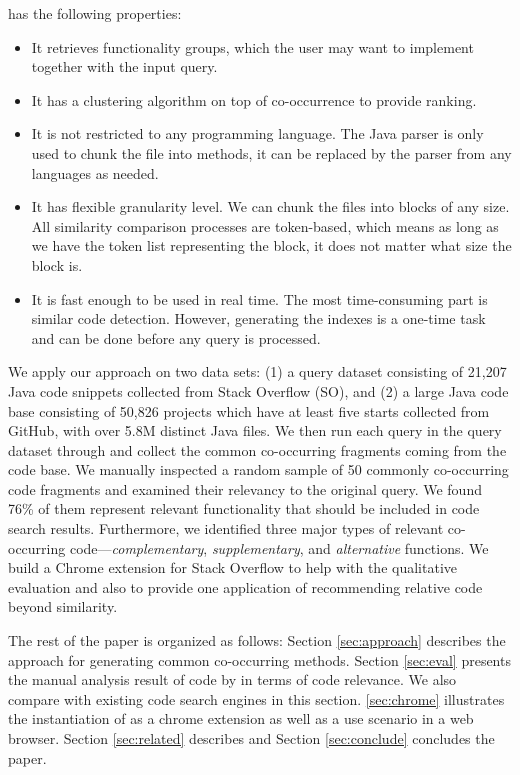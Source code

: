 {\tool} has the following properties:
\begin{itemize}
	\item It retrieves functionality groups, which the user may want to implement together with the input query.
	\item It has a clustering algorithm on top of co-occurrence to provide ranking.
	\item It is not restricted to any programming language. The Java parser is only used to chunk the file into methods, it can be replaced by the parser from any languages as needed.
	\item It has flexible granularity level. We can chunk the files into blocks of any size. All similarity comparison processes are token-based, which means as long as we have the token list representing the block, it does not matter what size the block is.
	\item It is fast enough to be used in real time. The most
          time-consuming part is similar code detection. However,
          generating the indexes is a one-time task and can be done
          before any query is processed.	
\end{itemize}

We apply our approach on two data sets: (1) a query dataset
consisting of 21,207 Java code snippets collected from Stack Overflow
(SO), and (2) a large Java code base consisting of 50,826 projects which 
have at least five starts collected from GitHub, with over 5.8M distinct 
Java files. We then run each query in the query dataset through {\tool} 
and collect the common co-occurring fragments coming from the code base. 
We manually inspected a random sample of 50 commonly co-occurring code fragments and examined their relevancy to the original query. 
We found 76\% of them represent relevant functionality that should be included in code search results.
Furthermore, we identified three major types of relevant co-occurring code---{\em complementary}, {\em supplementary}, and {\em alternative} functions.
We build a Chrome extension for Stack Overflow to help with the qualitative evaluation and also to provide one application of recommending relative code beyond similarity.

The rest of the paper is organized as follows: Section
\ref{sec:approach} describes the approach {\tool} for generating
common co-occurring methods. Section \ref{sec:eval} presents the manual analysis result of code by {\tool} in terms of code relevance. We also compare {\tool} with existing code search engines in this section. \ref{sec:chrome} illustrates the instantiation of {\tool} as a chrome extension as well as a use scenario in a web browser. Section \ref{sec:related} describes and Section \ref{sec:conclude} concludes the paper.
